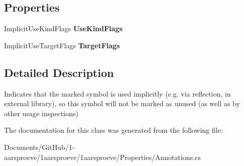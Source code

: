 \subsection*{Properties}
\begin{DoxyCompactItemize}
\item 
\hypertarget{class_used_implicitly_attribute_a7755e382c9638ee26bc7a45584ced5ff}{}Implicit\+Use\+Kind\+Flags {\bfseries Use\+Kind\+Flags}\label{class_used_implicitly_attribute_a7755e382c9638ee26bc7a45584ced5ff}

\item 
\hypertarget{class_used_implicitly_attribute_a2efb3586ffa41ca609769f825c07a508}{}Implicit\+Use\+Target\+Flags {\bfseries Target\+Flags}\label{class_used_implicitly_attribute_a2efb3586ffa41ca609769f825c07a508}

\end{DoxyCompactItemize}


\subsection{Detailed Description}
Indicates that the marked symbol is used implicitly (e.\+g. via reflection, in external library), so this symbol will not be marked as unused (as well as by other usage inspections) 



The documentation for this class was generated from the following file\+:\begin{DoxyCompactItemize}
\item 
Documents/\+Git\+Hub/1-\/aarsproeve/1aarsproeve/1aarsproeve/\+Properties/Annotations.\+cs\end{DoxyCompactItemize}
